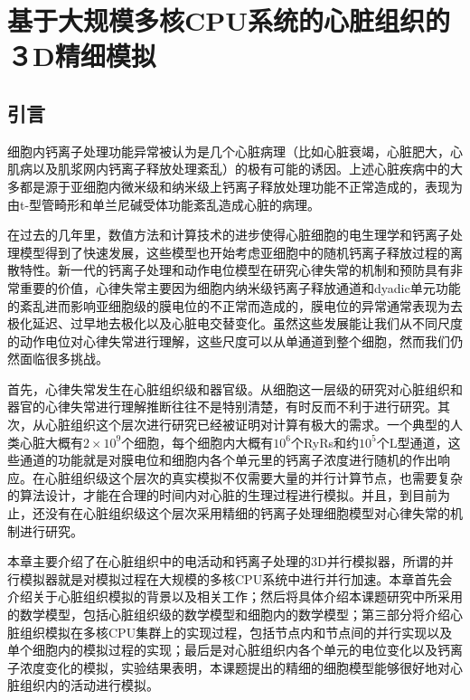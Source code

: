 \chapter{基于大规模多核CPU系统的心脏组织的３D精细模拟}
\label{ICA3PP}

\section{引言}
细胞内钙离子处理功能异常被认为是几个心脏病理（比如心脏衰竭，心脏肥大，心肌病以及肌浆网内钙离子释放处理紊乱）的极有可能的诱因。上述心脏疾病中的大多都是源于亚细胞内微米级和纳米级上钙离子释放处理功能不正常造成的，表现为由t-型管畸形和单兰尼碱受体功能紊乱造成心脏的病理。

在过去的几年里，数值方法和计算技术的进步使得心脏细胞的电生理学和钙离子处理模型得到了快速发展，这些模型也开始考虑亚细胞中的随机钙离子释放过程的离散特性。新一代的钙离子处理和动作电位模型在研究心律失常的机制和预防具有非常重要的价值，心律失常主要因为细胞内纳米级钙离子释放通道和dyadic单元功能的紊乱进而影响亚细胞级的膜电位的不正常而造成的，膜电位的异常通常表现为去极化延迟、过早地去极化以及心脏电交替变化。虽然这些发展能让我们从不同尺度的动作电位对心律失常进行理解，这些尺度可以从单通道到整个细胞，然而我们仍然面临很多挑战。

首先，心律失常发生在心脏组织级和器官级。从细胞这一层级的研究对心脏组织和器官的心律失常进行理解推断往往不是特别清楚，有时反而不利于进行研究。其次，从心脏组织这个层次进行研究已经被证明对计算有极大的需求。一个典型的人类心脏大概有$2 \times 10^9 $个细胞，每个细胞内大概有$10^6$个RyRs和约$10^5$个L型通道，这些通道的功能就是对膜电位和细胞内各个单元里的钙离子浓度进行随机的作出响应。在心脏组织级这个层次的真实模拟不仅需要大量的并行计算节点，也需要复杂的算法设计，才能在合理的时间内对心脏的生理过程进行模拟。并且，到目前为止，还没有在心脏组织级这个层次采用精细的钙离子处理细胞模型对心律失常的机制进行研究。

本章主要介绍了在心脏组织中的电活动和钙离子处理的3D并行模拟器，所谓的并行模拟器就是对模拟过程在大规模的多核CPU系统中进行并行加速。本章首先会介绍关于心脏组织模拟的背景以及相关工作；然后将具体介绍本课题研究中所采用的数学模型，包括心脏组织级的数学模型和细胞内的数学模型；第三部分将介绍心脏组织模拟在多核CPU集群上的实现过程，包括节点内和节点间的并行实现以及单个细胞内的模拟过程的实现；最后是对心脏组织内各个单元的电位变化以及钙离子浓度变化的模拟，实验结果表明，本课题提出的精细的细胞模型能够很好地对心脏组织内的活动进行模拟。


